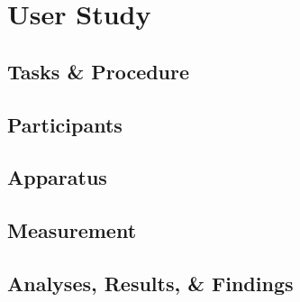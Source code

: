 \section{User Study}

\subsection{Tasks \& Procedure}


\subsection{Participants}


\subsection{Apparatus}

\subsection{Measurement}

\subsection{Analyses, Results, \& Findings}


